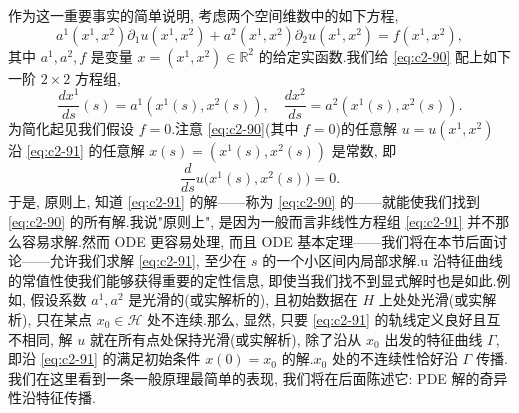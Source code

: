 作为这一重要事实的简单说明, 考虑两个空间维数中的如下方程,
\begin{equation}
a^{1}(x^{1}, x^{2}) \partial_{1} u(x^{1}, x^{2}) + a^{2}(x^{1}, x^{2}) \partial_{2} u(x^{1}, x^{2}) = f(x^{1}, x^{2}), \label{eq:c2-90}
\end{equation}
其中 $a^{1}, a^{2}, f$ 是变量 $x = (x^{1}, x^{2}) \in \mathbb{R}^{2}$ 的给定实函数.我们给 \eqref{eq:c2-90} 配上如下一阶 $2 \times 2$ 方程组,
\begin{equation}
\frac{d x^{1}}{d s}(s) = a^{1}(x^{1}(s), x^{2}(s)), \quad \frac{d x^{2}}{d s} = a^{2}(x^{1}(s), x^{2}(s)). \label{eq:c2-91}
\end{equation}
为简化起见我们假设 $f = 0$.注意 \eqref{eq:c2-90}(其中 $f = 0$)的任意解 $u = u(x^{1}, x^{2})$ 沿 \eqref{eq:c2-91} 的任意解 $x(s) = (x^{1}(s), x^{2}(s))$ 是常数, 即
\[
\frac{d}{d s} u\bigl(x^{1}(s), x^{2}(s)\bigr) = 0.
\]
于是, 原则上, 知道 \eqref{eq:c2-91} 的解——称为 \eqref{eq:c2-90} 的——就能使我们找到 \eqref{eq:c2-90} 的所有解.我说"原则上", 是因为一般而言非线性方程组 \eqref{eq:c2-91} 并不那么容易求解.然而 ODE 更容易处理, 而且 ODE 基本定理——我们将在本节后面讨论——允许我们求解 \eqref{eq:c2-91}, 至少在 $s$ 的一个小区间内局部求解.u 沿特征曲线的常值性使我们能够获得重要的定性信息, 即使当我们找不到显式解时也是如此.例如, 假设系数 $a^{1}, a^{2}$ 是光滑的(或实解析的), 且初始数据在 $H$ 上处处光滑(或实解析), 只在某点 $x_{0} \in \mathcal{H}$ 处不连续.那么, 显然, 只要 \eqref{eq:c2-91} 的轨线定义良好且互不相同, 解 $u$ 就在所有点处保持光滑(或实解析), 除了沿从 $x_{0}$ 出发的特征曲线 $\Gamma$, 即沿 \eqref{eq:c2-91} 的满足初始条件 $x(0) = x_{0}$ 的解.$x_{0}$ 处的不连续性恰好沿 $\Gamma$ 传播.我们在这里看到一条一般原理最简单的表现, 我们将在后面陈述它: PDE 解的奇异性沿特征传播.

